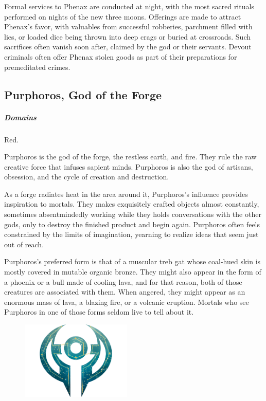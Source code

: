         Formal services to Phenax are conducted at night, with the most sacred rituals performed on nights of the new three moons.
        Offerings are made to attract Phenax's favor, with valuables from successful robberies, parchment filled with lies, or loaded dice being thrown into deep crags or buried at crossroads.
        Such sacrifices often vanish soon after, claimed by the god or their servants.
        Devout criminals often offer Phenax stolen goods as part of their preparations for premeditated crimes.

\subsection*{Purphoros, God of the Forge} \label{ssec::purphoros}
    \subparagraph{Domains} Red.

    Purphoros is the god of the forge, the restless earth, and fire.
    They rule the raw creative force that infuses sapient minds.
    Purphoros is also the god of artisans, obsession, and the cycle of creation and destruction.

    As a forge radiates heat in the area around it, Purphoros's influence provides inspiration to mortals.
    They makes exquisitely crafted objects almost constantly, sometimes absentmindedly working while they holds conversations with the other gods, only to destroy the finished product and begin again.
    Purphoros often feels constrained by the limits of imagination, yearning to realize ideas that seem just out of reach.

    Purphoros's preferred form is that of a muscular treb gat whose coal-hued skin is mostly covered in mutable organic bronze.
    They might also appear in the form of a phoenix or a bull made of cooling lava, and for that reason, both of those creatures are associated with them.
    When angered, they might appear as an enormous mass of lava, a blazing fire, or a volcanic eruption.
    Mortals who see Purphoros in one of those forms seldom live to tell about it.

    \begin{figure}[b]
        \centering
        \includegraphics[width=0.47\textwidth]{02viphoger/img/10s_purphoros.png}
    \end{figure}

